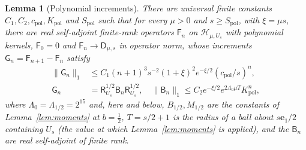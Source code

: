 \documentclass[aps,prl,reprint,longbibliography,raggedbottom]{revtex4-2}
\newtheorem{lemma}{Lemma}
\newcommand{\norm}[1]{\lVert #1\rVert}
\newcommand{\Hh}{\mathcal H}
\newcommand{\Res}{\mathsf R}
\newcommand{\JointRes}{\Res_{U_s}}
\newcommand{\JointD}{\mathsf D}
\newcommand{\eone}{\mathbf e_1}
\begin{document}
\begin{lemma}[Polynomial increments]\label{lem:polynomial}
There are universal finite constants
$C_1,C_2,c_{\mathrm{pol}},K_{\mathrm{pol}}$ and $S_{\mathrm{pol}}$ such
that for every $\mu>0$ and $s\ge S_{\mathrm{pol}}$, with $\xi=\mu s$,
there are real self-adjoint finite-rank operators $\mathsf F_n$ on
$\Hh_{\mu,U_s}$ with polynomial kernels, $\mathsf F_0=0$ and
$\mathsf F_n\to\JointD_{\mu,s}$ in operator norm, whose increments
$\mathsf G_n=\mathsf F_{n+1}-\mathsf F_n$ satisfy
\begin{align}
\norm{\mathsf G_n}_1&\le C_1(n+1)^3s^{-2}(1+\xi)^2e^{-\xi/2}(c_{\mathrm{pol}}/s)^n,
\label{eq:increment-unweighted}\\
\mathsf G_n&=\JointRes^{1/2}\mathsf B_n\JointRes^{1/2},\quad
\norm{\mathsf B_n}_1\le C_2e^{-\xi/2}e^{2\Lambda_0\mu T}K_{\mathrm{pol}}^n,
\label{eq:increment-weighted}
\end{align}
where $\Lambda_0=\Lambda_{1/2}=2^{15}$ and, here and below,
$B_{1/2},M_{1/2}$ are the constants of Lemma~\ref{lem:moments} at
$b=\frac12$, $T=s/2+1$ is the radius of a ball about $s\eone/2$
containing $U_s$ (the value at which Lemma~\ref{lem:moments} is
applied), and the $\mathsf B_n$ are real self-adjoint of finite rank.
\end{lemma}
\end{document}
